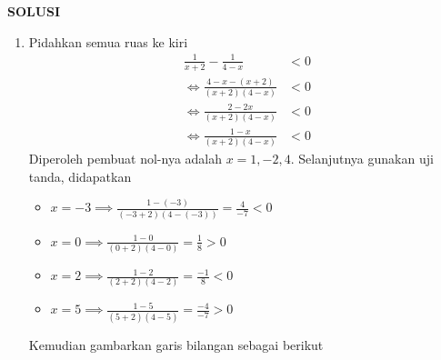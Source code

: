 \documentclass[11pt,openany,a4paper]{article}
\renewcommand{\headrulewidth}{0pt}
\begin{document}


\newpage
{}
\fancyfoot{}
{\centering\textbf{SOLUSI}}
\renewcommand{\arraystretch}{1.5}
\renewcommand{\headrulewidth}{1pt}
\begin{enumerate}
    \item Pidahkan semua ruas ke kiri
          \begin{align*}
              \frac{1}{x+2}-\frac{1}{4-x}         & < 0 \\
              \iff \frac{4-x - (x+2)}{(x+2)(4-x)} & < 0 \\
              \iff \frac{2 - 2x}{(x+2)(4-x)}      & < 0 \\
              \iff \frac{1-x}{(x+2)(4-x)}         & < 0
          \end{align*}
          Diperoleh pembuat nol-nya adalah $x = 1, -2, 4$. Selanjutnya gunakan uji tanda, didapatkan
          \begin{itemize}
              \item $\displaystyle x=-3 \implies \frac{1-(-3)}{(-3+2)(4-(-3))} = \frac{4}{-7} < 0$
              \item $\displaystyle x=0 \implies \frac{1-0}{(0+2)(4-0)} = \frac{1}{8} > 0$
              \item $\displaystyle x=2 \implies \frac{1-2}{(2+2)(4-2)} = \frac{-1}{8} < 0$
              \item $\displaystyle x=5 \implies \frac{1-5}{(5+2)(4-5)} = \frac{-4}{-7} > 0$
          \end{itemize}
          Kemudian gambarkan garis bilangan sebagai berikut
          \begin{center}
\end{center}
\end{enumerate}
\end{document}

